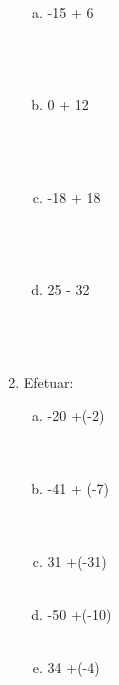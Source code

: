 \documentclass[a4paper,14pt]{article}
\begin{document}
\begin{multicols}{2}
\begin{enumerate}
\begin{enumerate}[a)]
    			\item -15 + 6 \\\\\\\\
    			\item 0 + 12 \\\\\\\\
    			\item -18 + 18 \\\\\\\\
    			\item 25 - 32 \\\\\\\\
    		\end{enumerate}
    		\item Efetuar:
    		\begin{enumerate}[a)]
    			\item -20 +(-2) \\\\\\
    			\item -41 + (-7) \\\\\\
    			\item 31 +(-31) \\\\
    			\item -50 +(-10) \\\\
    			\item 34 +(-4) \\\\\\
    		\end{enumerate}
    	\end{enumerate}
    \end{multicols}
\end{document}
